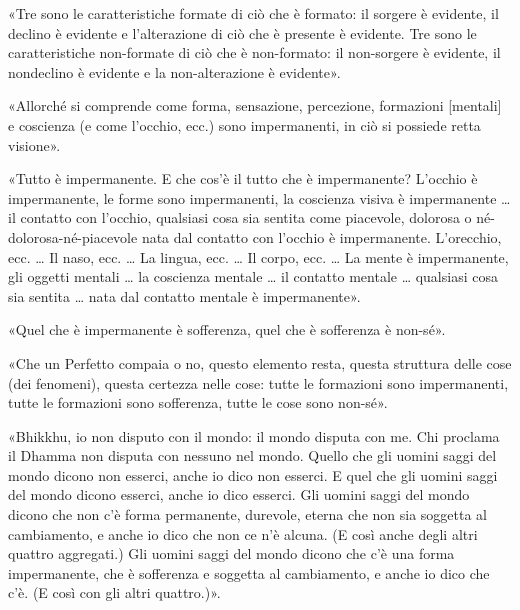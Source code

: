  «Tre sono le caratteristiche formate di ciò che è
formato:
il sorgere è evidente, il declino è evidente e l’alterazione di ciò che è
presente è evidente. Tre sono le caratteristiche non-formate di ciò che è
non-formato: il non-sorgere è evidente, il nondeclino è evidente e la
non-alterazione è evidente».


«Allorché si comprende come forma, sensazione, percezione, formazioni [mentali]
e coscienza (e come l’occhio, ecc.) sono impermanenti, in ciò si possiede retta
visione».


«Tutto è impermanente. E che cos’è il tutto che è impermanente? L’occhio è
impermanente, le forme sono impermanenti, la coscienza visiva è impermanente …
il contatto con l’occhio, qualsiasi cosa sia sentita come piacevole, dolorosa o
né-dolorosa-né-piacevole nata dal contatto con l’occhio è impermanente.
L’orecchio, ecc. … Il naso, ecc. … La lingua, ecc. … Il corpo, ecc. … La mente è
impermanente, gli oggetti mentali … la coscienza mentale … il contatto mentale …
qualsiasi cosa sia sentita … nata dal contatto mentale è impermanente».


«Quel che è impermanente è sofferenza, quel che è sofferenza è non-sé».


«Che un Perfetto compaia o no, questo elemento resta, questa struttura delle
cose (dei fenomeni), questa certezza nelle cose: tutte le formazioni sono
impermanenti, tutte le formazioni sono sofferenza, tutte le cose sono non-sé».


«Bhikkhu, io non disputo con il mondo: il mondo disputa con me. Chi proclama il
Dhamma non disputa con nessuno nel mondo. Quello che gli uomini saggi del mondo
dicono non esserci, anche io dico non esserci. E quel che gli uomini saggi del
mondo dicono esserci, anche io dico esserci. Gli uomini saggi del mondo dicono
che non c’è forma permanente, durevole, eterna che non sia soggetta al
cambiamento, e anche io dico che non ce n’è alcuna. (E così anche degli altri
quattro aggregati.) Gli uomini saggi del mondo dicono che c’è una forma
impermanente, che è sofferenza e soggetta al cambiamento, e anche io dico che
c’è. (E così con gli altri quattro.)».


